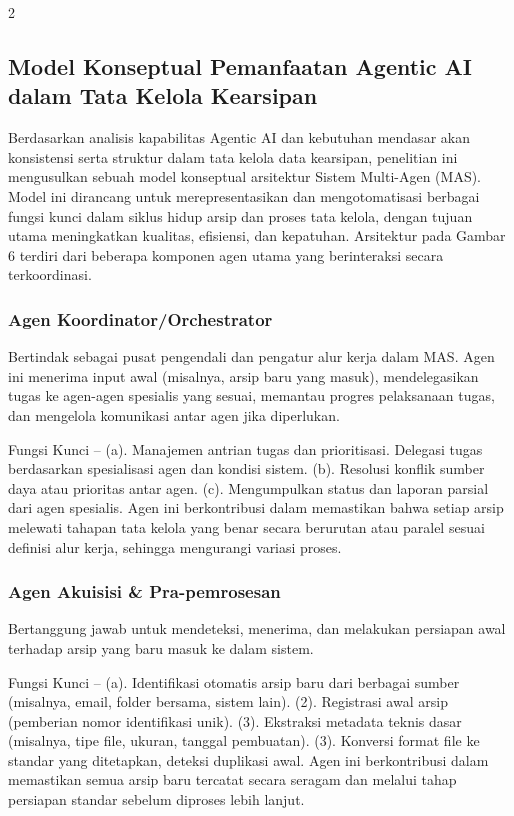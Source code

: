 \documentclass[12pt,a4paper]{article}
\begin{document}
\begin{multicols}{2}
\subsection{Model Konseptual Pemanfaatan Agentic AI dalam Tata Kelola Kearsipan}

Berdasarkan analisis kapabilitas Agentic AI dan kebutuhan mendasar akan konsistensi serta struktur dalam tata kelola data kearsipan, penelitian ini mengusulkan sebuah model konseptual arsitektur Sistem Multi-Agen (MAS). Model ini dirancang untuk merepresentasikan dan mengotomatisasi berbagai fungsi kunci dalam siklus hidup arsip dan proses tata kelola, dengan tujuan utama meningkatkan kualitas, efisiensi, dan kepatuhan. Arsitektur pada Gambar 6 terdiri dari beberapa komponen agen utama yang berinteraksi secara terkoordinasi.

\subsubsection{Agen Koordinator/Orchestrator}

Bertindak sebagai pusat pengendali dan pengatur alur kerja dalam MAS. Agen ini menerima input awal (misalnya, arsip baru yang masuk), mendelegasikan tugas ke agen-agen spesialis yang sesuai, memantau progres pelaksanaan tugas, dan mengelola komunikasi antar agen jika diperlukan.

Fungsi Kunci -- (a). Manajemen antrian tugas dan prioritisasi. Delegasi tugas berdasarkan spesialisasi agen dan kondisi sistem. (b). Resolusi konflik sumber daya atau prioritas antar agen. (c). Mengumpulkan status dan laporan parsial dari agen spesialis. Agen ini berkontribusi dalam memastikan bahwa setiap arsip melewati tahapan tata kelola yang benar secara berurutan atau paralel sesuai definisi alur kerja, sehingga mengurangi variasi proses.

\subsubsection{Agen Akuisisi \& Pra-pemrosesan}

Bertanggung jawab untuk mendeteksi, menerima, dan melakukan persiapan awal terhadap arsip yang baru masuk ke dalam sistem.

Fungsi Kunci -- (a). Identifikasi otomatis arsip baru dari berbagai sumber (misalnya, email, folder bersama, sistem lain). (2). Registrasi awal arsip (pemberian nomor identifikasi unik). (3). Ekstraksi metadata teknis dasar (misalnya, tipe file, ukuran, tanggal pembuatan). (3). Konversi format file ke standar yang ditetapkan, deteksi duplikasi awal. Agen ini berkontribusi dalam memastikan semua arsip baru tercatat secara seragam dan melalui tahap persiapan standar sebelum diproses lebih lanjut.


\end{multicols}
\end{document}
